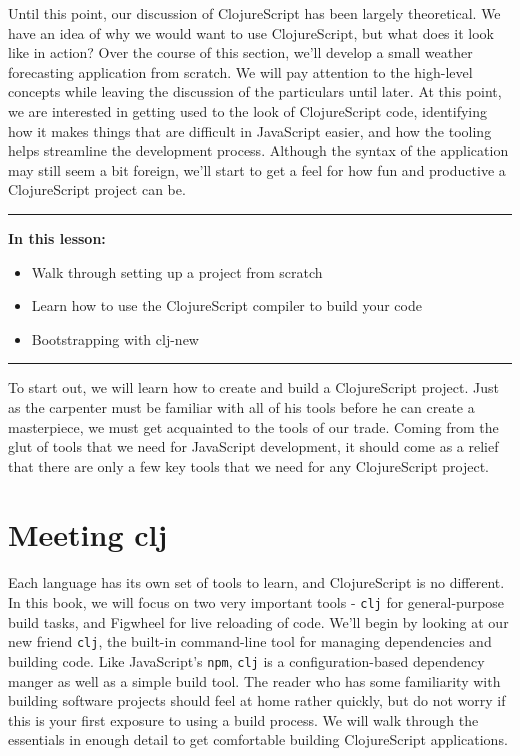 \documentclass[10pt,twoside,openright]{memoir}
\begin{document}
Until this point, our discussion of ClojureScript has been largely
theoretical. We have an idea of why we would want to use ClojureScript,
but what does it look like in action? Over the course of this section,
we'll develop a small weather forecasting application from scratch. We
will pay attention to the high-level concepts while leaving the
discussion of the particulars until later. At this point, we are
interested in getting used to the look of ClojureScript code,
identifying how it makes things that are difficult in JavaScript easier,
and how the tooling helps streamline the development process. Although
the syntax of the application may still seem a bit foreign, we'll start
to get a feel for how fun and productive a ClojureScript project can be.

\begin{center}\rule{0.5\linewidth}{0.5pt}\end{center}

\textbf{In this lesson:}

\begin{itemize}
\tightlist
\item
  Walk through setting up a project from scratch
\item
  Learn how to use the ClojureScript compiler to build your code
\item
  Bootstrapping with clj-new
\end{itemize}

\begin{center}\rule{0.5\linewidth}{0.5pt}\end{center}

To start out, we will learn how to create and build a ClojureScript
project. Just as the carpenter must be familiar with all of his tools
before he can create a masterpiece, we must get acquainted to the tools
of our trade. Coming from the glut of tools that we need for JavaScript
development, it should come as a relief that there are only a few key
tools that we need for any ClojureScript project.

\section{Meeting clj}

Each language has its own set of tools to learn, and ClojureScript is no
different. In this book, we will focus on two very important tools -
\texttt{clj} for general-purpose build tasks, and Figwheel for live
reloading of code. We'll begin by looking at our new friend
\texttt{clj}, the built-in command-line tool for managing dependencies
and building code. Like JavaScript's \texttt{npm}, \texttt{clj} is a
configuration-based dependency manger as well as a simple build tool.
The reader who has some familiarity with building software projects
should feel at home rather quickly, but do not worry if this is your
first exposure to using a build process. We will walk through the
essentials in enough detail to get comfortable building ClojureScript
applications.
\end{document}

